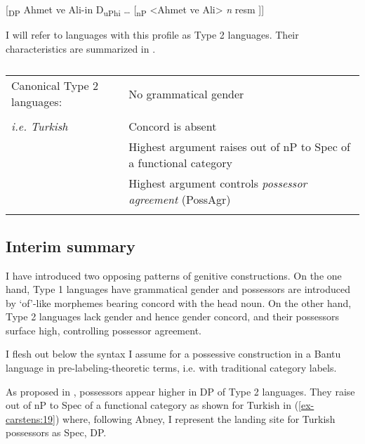 \documentclass[output=paper
,modfonts
,nonflat]{langsci/langscibook}
\begin{document}
\begin{exe}
	[\textsubscript{DP} Ahmet ve Ali-in D\textsubscript{uPhi} … [\textsubscript{nP} <Ahmet ve Ali>  \textit{n} resm ]]
\end{exe}
I will refer to languages with this profile as Type 2 languages. Their characteristics are summarized in .
\begin{table}
	\caption{}
	\label{tab-carstens:2}
	\begin{tabularx}{\textwidth}{lX}
		\lsptoprule
		Canonical Type 2 languages: &  No grammatical gender\\ \\
		\textit{i.e. Turkish}  & Concord is absent\\
		& Highest argument raises out of nP to Spec of a functional category\\
		& Highest argument controls \textit{possessor agreement} (PossAgr)\\
		\lspbottomrule
	\end{tabularx}
\end{table} \newpage \noindent
\subsection{Interim summary} \label{sec-carstens:2.3}

I have introduced two opposing patterns of genitive constructions. On the one hand, Type 1 languages have grammatical gender and possessors are introduced by ‘of’-like morphemes bearing concord with the head noun. On the other hand, Type 2 languages lack gender and hence gender concord, and their possessors surface high, controlling possessor agreement. 

I flesh out below the syntax I assume for a possessive construction in a Bantu language in pre-labeling-theoretic terms, i.e. with traditional category labels.

\begin{figure}[!h]
	\begin{exe}
	\end{exe} \vspace{-0.6cm}
\end{figure}
\noindent As proposed in \citet{Abney1987}, possessors appear higher in DP of Type 2 languages. They raise out of nP to Spec of a functional category as shown for Turkish in (\ref{ex-carstens:19}) where, following Abney, I represent the landing site for Turkish possessors as Spec, DP.          
\end{document}
